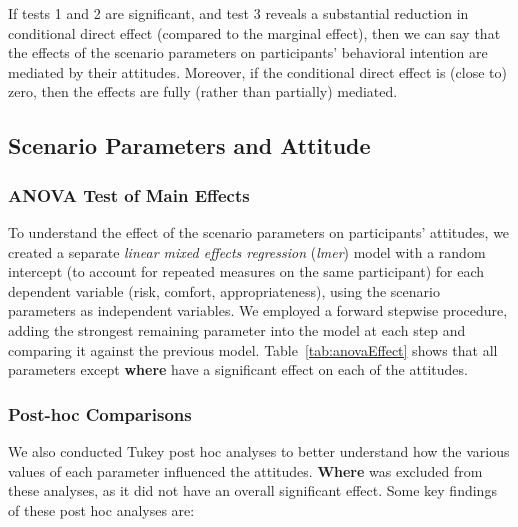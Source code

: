 If tests 1 and 2 are significant, and test 3 reveals a substantial reduction in conditional direct effect (compared to the marginal effect), then we can say that the effects of the scenario parameters on participants' behavioral intention are mediated by their attitudes. Moreover, if the conditional direct effect is (close to) zero, then the effects are fully (rather than partially) mediated.

\subsection{Scenario Parameters and Attitude}\label{subsec:attitude}
\subsubsection{ANOVA Test of Main Effects}
To understand the effect of the scenario parameters on participants' attitudes, we created a separate \textit{linear mixed effects regression} (\textit{lmer}) model with a random intercept (to account for repeated measures on the same participant) for each dependent variable (risk, comfort, appropriateness), using the scenario parameters as independent variables. We employed a forward stepwise procedure, adding the strongest remaining parameter into the model at each step and comparing it against the previous model. Table~\ref{tab:anovaEffect} shows that all parameters except \textbf{where} have a significant effect on each of the attitudes.

\subsubsection{Post-hoc Comparisons}
We also conducted Tukey post hoc analyses to better understand how the various values of each parameter influenced the attitudes. \textbf{Where} was excluded from these analyses, as it did not have an overall significant effect. Some key findings of these post hoc analyses are:

